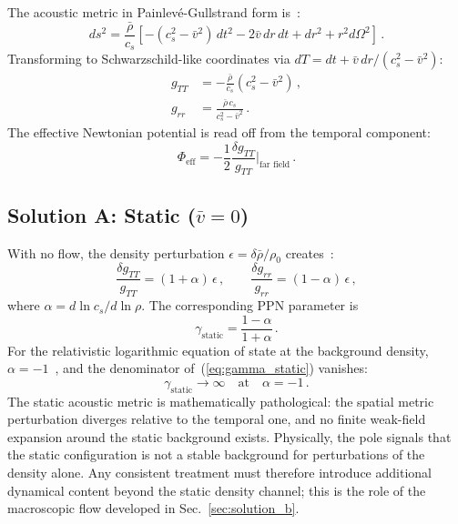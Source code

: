 \documentclass[12pt, a4paper]{article}
\newcommand{\cs}{c_s}
\newcommand{\rhob}{\bar{\rho}}
\newcommand{\vb}{\bar{v}}
\newcommand{\Phieff}{\Phi_{\mathrm{eff}}}
\begin{document}
The acoustic metric in Painlev\'{e}-Gullstrand form is~\cite{unruh_1981,visser_1998}:
\begin{equation}
    ds^2 = \frac{\rhob}{\cs}\!\left[-(c_s^2 - \vb^2)\,dt^2 - 2\vb\,dr\,dt + dr^2 + r^2 d\Omega^2\right]\,.
\label{eq:acoustic_metric}
\end{equation}
Transforming to Schwarzschild-like coordinates via $dT = dt + \vb\,dr/(c_s^2 - \vb^2)$:
\begin{align}
    g_{TT} &= -\frac{\rhob}{\cs}(c_s^2 - \vb^2)\,,\\
    g_{rr} &= \frac{\rhob\,\cs}{c_s^2 - \vb^2}\,.
\end{align}
The effective Newtonian potential is read off from the temporal component:
\begin{equation}
    \Phieff = -\frac{1}{2}\frac{\delta g_{TT}}{g_{TT}}\bigg|_{\text{far field}}\,.
\label{eq:phi_from_metric}
\end{equation}

\subsection{Solution A: Static (\texorpdfstring{$\vb = 0$}{v=0})}

With no flow, the density perturbation $\epsilon = \delta\rhob/\rho_0$ creates~\cite{kulangiev_2026}:
\begin{equation}
    \frac{\delta g_{TT}}{g_{TT}} = (1+\alpha)\,\epsilon\,,\qquad
    \frac{\delta g_{rr}}{g_{rr}} = (1-\alpha)\,\epsilon\,,
\end{equation}
where $\alpha = d\ln c_s / d\ln\rho$. The corresponding PPN parameter is
\begin{equation}
    \gamma_{\mathrm{static}} = \frac{1-\alpha}{1+\alpha}\,.
\label{eq:gamma_static}
\end{equation}
For the relativistic logarithmic equation of state at the background density, $\alpha = -1$~\cite{kulangiev_2026}, and the denominator of~(\ref{eq:gamma_static}) vanishes:
\begin{equation}
    \gamma_{\mathrm{static}} \to \infty\quad\text{at}\quad \alpha = -1\,.
\label{eq:gamma_pathology}
\end{equation}
The static acoustic metric is mathematically pathological: the spatial metric perturbation diverges relative to the temporal one, and no finite weak-field expansion around the static background exists. Physically, the pole signals that the static configuration is not a stable background for perturbations of the density alone. Any consistent treatment must therefore introduce additional dynamical content beyond the static density channel; this is the role of the macroscopic flow developed in Sec.~\ref{sec:solution_b}.
\end{document}
